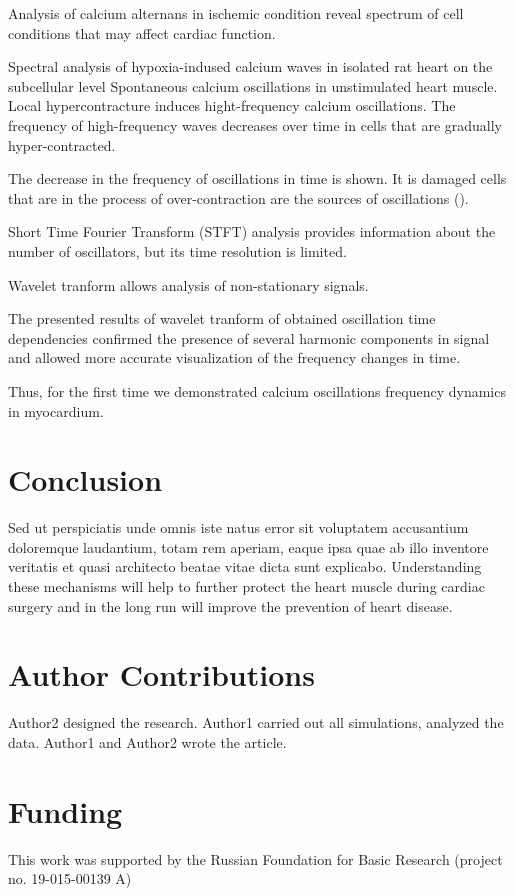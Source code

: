 \documentclass{biophys-new}
\begin{document}
Analysis of calcium alternans in ischemic condition reveal spectrum of cell conditions that may affect cardiac function.

Spectral analysis of hypoxia-indused calcium waves in isolated rat heart on the subcellular level
Spontaneous calcium oscillations in unstimulated heart muscle.
Local hypercontracture induces hight-frequency calcium oscillations.
The frequency of high-frequency waves decreases over time in cells that are gradually hyper-contracted.

The decrease in the frequency of oscillations in time is shown.
It is damaged cells that are in the process of over-contraction
are the sources of oscillations (\cite{sato2014depolarization}).

Short Time Fourier Transform (STFT) analysis provides information about the number of oscillators, but its time resolution is limited.

Wavelet tranform allows analysis of non-stationary signals.

The presented results of wavelet tranform of obtained oscillation time dependencies confirmed the presence of several harmonic components in signal
and allowed more accurate visualization of the frequency changes in time.

Thus, for the first time we demonstrated calcium oscillations frequency dynamics in myocardium.

\section*{Conclusion}
Sed ut perspiciatis unde omnis iste natus error sit voluptatem accusantium doloremque laudantium, totam rem aperiam, eaque ipsa quae ab illo inventore veritatis et quasi architecto beatae vitae dicta sunt explicabo.
Understanding these mechanisms will help to further protect the heart muscle during cardiac surgery and in the long run will improve the prevention of heart disease.

\section*{Author Contributions}
Author2 designed the research. Author1 carried out all simulations, analyzed the data. Author1 and Author2 wrote the article.

\section*{Funding}
This work was supported by the Russian Foundation for Basic Research (project no. 19-015-00139 A)
\end{document}
